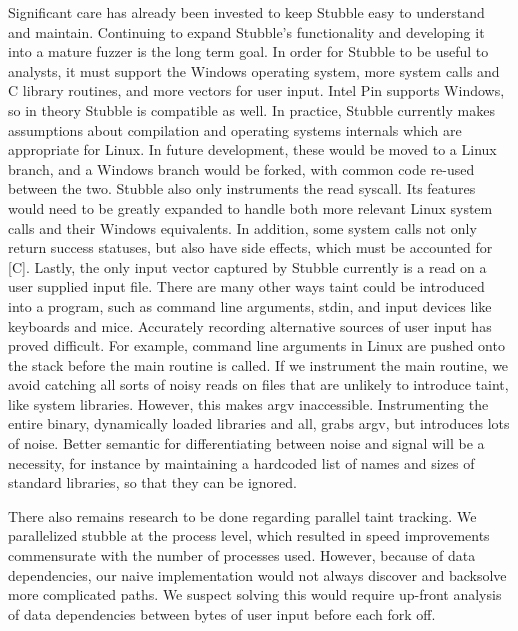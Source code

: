 \documentclass[11pt,expanded,copyright]{fsuthesis}
\begin{document}
Significant care has already been invested to keep Stubble easy to understand and maintain. Continuing to expand Stubble's functionality and developing it into a mature fuzzer is the long term goal. In order for Stubble to be useful to analysts, it must support the Windows operating system, more system calls and C library routines, and more vectors for user input. Intel Pin supports Windows, so in theory Stubble is compatible as well. In practice, Stubble currently makes assumptions about compilation and operating systems internals which are appropriate for Linux. In future development, these would be moved to a Linux branch, and a Windows branch would be forked, with common code re-used between the two. Stubble also only instruments the read syscall. Its features would need to be greatly expanded to handle both more relevant Linux system calls and their Windows equivalents. In addition, some system calls not only return success statuses, but also have side effects, which must be accounted for [C]. Lastly, the only input vector captured by Stubble currently is a read on a user supplied input file. There are many other ways taint could be introduced into a program, such as command line arguments, stdin, and input devices like keyboards and mice. Accurately recording alternative sources of user input has proved difficult. For example, command line arguments in Linux are pushed onto the stack before the main routine is called. If we instrument the main routine, we avoid catching all sorts of noisy reads on files that are unlikely to introduce taint, like system libraries. However, this makes argv inaccessible. Instrumenting the entire binary, dynamically loaded libraries and all, grabs argv, but introduces lots of noise. Better semantic for differentiating between noise and signal will be a necessity, for instance by maintaining a hardcoded list of names and sizes of standard libraries, so that they can be ignored.

There also remains research to be done regarding parallel taint tracking. We parallelized stubble at the process level, which resulted in speed improvements commensurate with the number of processes used. However, because of data dependencies, our naive implementation would not always discover and backsolve more complicated paths. We suspect solving this would require up-front analysis of data dependencies between bytes of user input before each fork off. 

\end{document}
